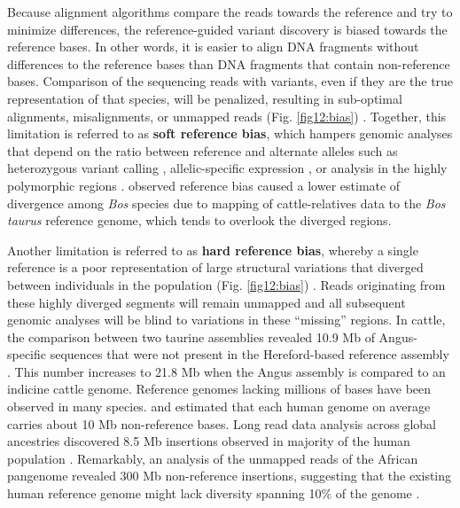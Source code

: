 \documentclass[../main.tex]{subfiles}
\begin{document}
Because alignment algorithms compare the reads towards the reference and try to minimize differences, the reference-guided variant discovery is biased towards the reference bases. In other words, it is easier to align DNA fragments without differences to the reference bases than DNA fragments  that contain non-reference bases. Comparison of the sequencing reads with variants, even if they are the true representation of that species, will be penalized, resulting in sub-optimal alignments, misalignments, or unmapped reads (Fig. \ref{fig12:bias}) \citep{pritt2018forge}. Together, this limitation is referred to as \textbf{soft reference bias}, which hampers genomic analyses that depend on the ratio between reference and alternate alleles such as heterozygous variant calling \citep{garrison2018variation}, allelic-specific expression \citep{salavati2019elimination}, or analysis in the highly polymorphic regions \citep{dilthey2015improved}. \citet{wu2018pervasive} observed reference bias caused a lower estimate of divergence among\emph{ Bos} species due to mapping of cattle-relatives data to the \emph{Bos taurus} reference genome, which tends to overlook the diverged regions. 

Another limitation is referred to as \textbf{hard reference bias}, whereby a single reference is a poor representation of large structural variations that diverged between individuals in the population (Fig. \ref{fig12:bias}) \citep{colquhoun2020nucleotide}. Reads originating from these highly diverged segments will remain unmapped and all subsequent genomic analyses will be blind to variations in these “missing” regions. In cattle, the comparison between two taurine assemblies revealed 10.9 Mb of Angus-specific sequences that were not present in the Hereford-based reference assembly \citep{Low2020}. This number increases to 21.8 Mb when the Angus assembly is compared to an indicine cattle genome. Reference genomes lacking millions of bases have been observed in many species. \citet{ameur2018novo} and \citet{audano2019characterizing} estimated that each human genome on average carries about 10 Mb non-reference bases. Long read data analysis across global ancestries discovered 8.5 Mb insertions observed in majority of the human population \citep{audano2019characterizing}. Remarkably, an analysis of the unmapped reads of the African pangenome revealed 300 Mb non-reference insertions, suggesting that the existing human reference genome might lack diversity spanning 10\% of the genome \citep{sherman2019assembly}. \\
\end{document}
